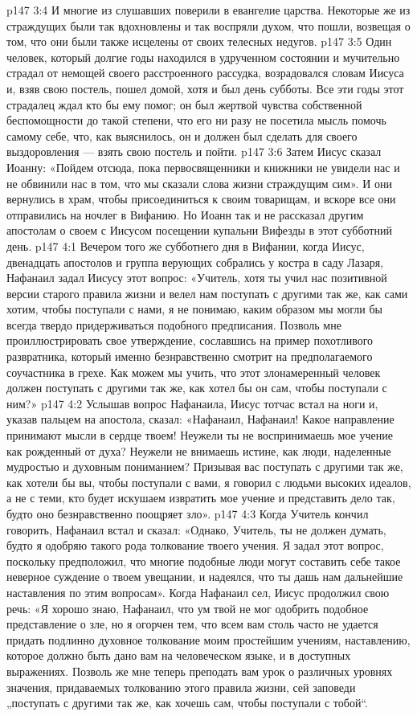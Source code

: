 \vs p147 3:4 И многие из слушавших поверили в евангелие царства. Некоторые же из страждущих были так вдохновлены и так воспряли духом, что пошли, возвещая о том, что они были также исцелены от своих телесных недугов.
\vs p147 3:5 Один человек, который долгие годы находился в удрученном состоянии и мучительно страдал от немощей своего расстроенного рассудка, возрадовался словам Иисуса и, взяв свою постель, пошел домой, хотя и был день субботы. Все эти годы этот страдалец ждал  кто бы ему помог; он был жертвой чувства собственной беспомощности до такой степени, что его ни разу не посетила мысль помочь самому себе, что, как выяснилось, он и должен был сделать для своего выздоровления --- взять свою постель и пойти.
\vs p147 3:6 Затем Иисус сказал Иоанну: «Пойдем отсюда, пока первосвященники и книжники не увидели нас и не обвинили нас в том, что мы сказали слова жизни страждущим сим». И они вернулись в храм, чтобы присоединиться к своим товарищам, и вскоре все они отправились на ночлег в Вифанию. Но Иоанн так и не рассказал другим апостолам о своем с Иисусом посещении купальни Вифезды в этот субботний день.
\vs p147 4:1 Вечером того же субботнего дня в Вифании, когда Иисус, двенадцать апостолов и группа верующих собрались у костра в саду Лазаря, Нафанаил задал Иисусу этот вопрос: «Учитель, хотя ты учил нас позитивной версии старого правила жизни и велел нам поступать с другими так же, как сами хотим, чтобы поступали с нами, я не понимаю, каким образом мы могли бы всегда твердо придерживаться подобного предписания. Позволь мне проиллюстрировать свое утверждение, сославшись на пример похотливого развратника, который именно безнравственно смотрит на предполагаемого соучастника в грехе. Как можем мы учить, что этот злонамеренный человек должен поступать с другими так же, как хотел бы он сам, чтобы поступали с ним?»
\vs p147 4:2 Услышав вопрос Нафанаила, Иисус тотчас встал на ноги и, указав пальцем на апостола, сказал: «Нафанаил, Нафанаил! Какое направление принимают мысли в сердце твоем! Неужели ты не воспринимаешь мое учение как рожденный от духа? Неужели не внимаешь истине, как люди, наделенные мудростью и духовным пониманием? Призывая вас поступать с другими так же, как хотели бы вы, чтобы поступали с вами, я говорил с людьми высоких идеалов, а не с теми, кто будет искушаем извратить мое учение и представить дело так, будто оно безнравственно поощряет зло».
\vs p147 4:3 Когда Учитель кончил говорить, Нафанаил встал и сказал: «Однако, Учитель, ты не должен думать, будто я одобряю такого рода толкование твоего учения. Я задал этот вопрос, поскольку предположил, что многие подобные люди могут составить себе такое неверное суждение о твоем увещании, и надеялся, что ты дашь нам дальнейшие наставления по этим вопросам». Когда Нафанаил сел, Иисус продолжил свою речь: «Я хорошо знаю, Нафанаил, что ум твой не мог одобрить подобное представление о зле, но я огорчен тем, что всем вам столь часто не удается придать подлинно духовное толкование моим простейшим учениям, наставлению, которое должно быть дано вам на человеческом языке, и в доступных выражениях. Позволь же мне теперь преподать вам урок о различных уровнях значения, придаваемых толкованию этого правила жизни, сей заповеди „поступать с другими так же, как хочешь сам, чтобы поступали с тобой“.
